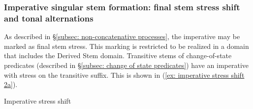 \subsubsection{Imperative singular stem formation: final stem stress shift and tonal alternations}
\label{subsubsec: imperative singular stem formation}



As described in §\ref{subsec: non-concatenative processes}, the imperative may be marked as final stem stress. This marking is restricted to be realized in a domain that includes the Derived Stem domain. Transitive stems of change-of-state predicates (described in §\ref{subsec: change of state predicates}) have an imperative with stress on the transitive suffix. This is shown in (\ref{ex: imperative stress shift 2a}).

\ea\label{ex: imperative stress shift 2}
{Imperative stress shift}

    \label{ex: imperative stress shift 2a}
        \label{ex: imperative stress shift 2b}
            \label{ex: imperative stress shift 2c}
    \z
\z

